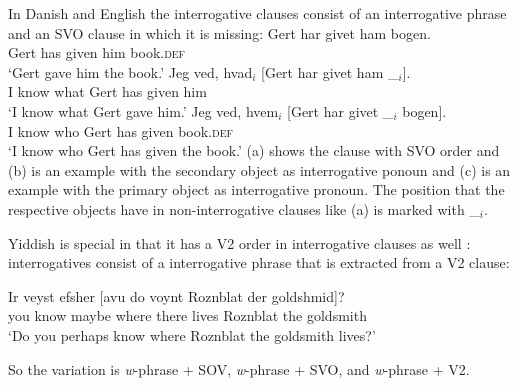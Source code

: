 In Danish and English the interrogative clauses consist of an interrogative phrase and an SVO clause
in which it is missing:
\eal
\ex 
\gll Gert har givet ham bogen.\\
     Gert has given him book.\textsc{def}\\
\glt `Gert gave him the book.'
\ex
\gll Jeg ved, hvad$_i$ [Gert har givet ham \_$_i$].\\
     I know what \spacebr{}Gert has given him\\
\glt `I know what Gert gave him.'
\ex
\gll Jeg ved, hvem$_i$ [Gert har givet \_$_i$   bogen].\\
     I know who        \spacebr{}Gert has given {} book.\textsc{def}\\
\glt `I know who Gert has given the book.'
\zl
(a) shows the clause with SVO order and (b) is an example with the secondary object as
interrogative ponoun and (c) is an example with the primary object as interrogative
pronoun. The position that the respective objects have in non-interrogative clauses like (a)
is marked with \_$_i$.

Yiddish is special in that it has a V2 order in interrogative clauses as well \citep[Sections~4.1, 4.2]{Diesing90a}: interrogatives
consist of a interrogative phrase that is extracted from a V2 clause:

\ea
\gll Ir veyst efsher [avu            do    voynt Roznblat   der goldshmid]?\footnotemark\\
     you know maybe  \spacebr{}where there lives Roznblat the goldsmith\\
\glt `Do you perhaps know where Roznblat the goldsmith lives?' 
\z


So the variation is \emph{w}-phrase + SOV, \emph{w}-phrase + SVO, and \emph{w}-phrase + V2.


